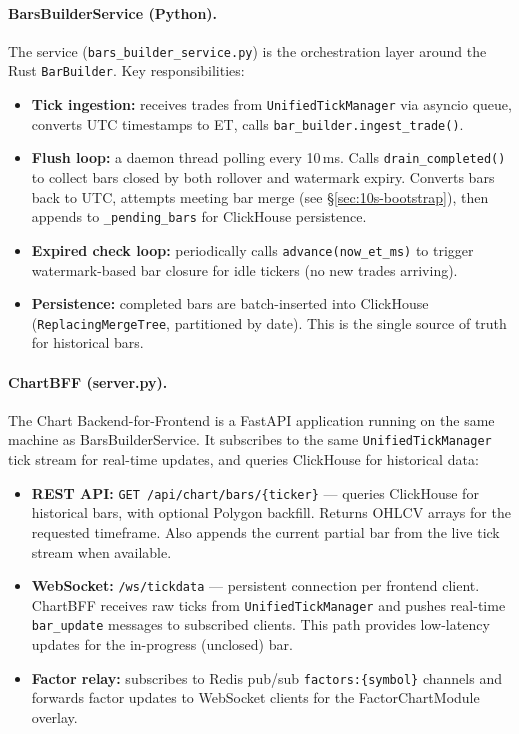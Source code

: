 \documentclass[a4paper, 11pt]{article}
\begin{document}
\paragraph{BarsBuilderService (Python).}
The service (\texttt{bars\_builder\_service.py}) is the orchestration layer
around the Rust \texttt{BarBuilder}.  Key responsibilities:

\begin{itemize}[nosep]
    \item \textbf{Tick ingestion:} receives trades from
          \texttt{UnifiedTickManager} via asyncio queue, converts UTC
          timestamps to ET, calls \texttt{bar\_builder.ingest\_trade()}.
    \item \textbf{Flush loop:} a daemon thread polling every 10\,ms.  Calls
          \texttt{drain\_completed()} to collect bars closed by both rollover
          and watermark expiry.  Converts bars back to UTC, attempts meeting
          bar merge (see \S\ref{sec:10s-bootstrap}), then appends to
          \texttt{\_pending\_bars} for ClickHouse persistence.
    \item \textbf{Expired check loop:} periodically calls
          \texttt{advance(now\_et\_ms)} to trigger watermark-based bar
          closure for idle tickers (no new trades arriving).
    \item \textbf{Persistence:} completed bars are batch-inserted into
          ClickHouse (\texttt{ReplacingMergeTree}, partitioned by date).
          This is the single source of truth for historical bars.
\end{itemize}

\paragraph{ChartBFF (server.py).}
The Chart Backend-for-Frontend is a FastAPI application running on the
same machine as BarsBuilderService.  It subscribes to the same
\texttt{UnifiedTickManager} tick stream for real-time updates, and queries
ClickHouse for historical data:

\begin{itemize}[nosep]
    \item \textbf{REST API:} \texttt{GET /api/chart/bars/\{ticker\}} ---
          queries ClickHouse for historical bars, with optional Polygon
          backfill.  Returns OHLCV arrays for the requested timeframe.
          Also appends the current partial bar from the live tick stream
          when available.
    \item \textbf{WebSocket:} \texttt{/ws/tickdata} --- persistent connection
          per frontend client.  ChartBFF receives raw ticks from
          \texttt{UnifiedTickManager} and pushes real-time
          \texttt{bar\_update} messages to subscribed clients.  This path
          provides low-latency updates for the in-progress (unclosed) bar.
    \item \textbf{Factor relay:} subscribes to Redis pub/sub
          \texttt{factors:\{symbol\}} channels and forwards factor updates
          to WebSocket clients for the FactorChartModule overlay.
\end{itemize}
\end{document}
